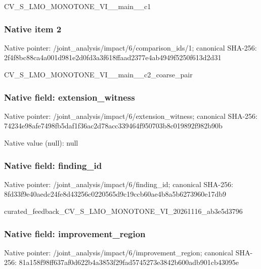 \documentclass[10pt,a4paper]{article}
\begin{document}
\begingroup\raggedright\sloppy CV\_\allowbreak{}S\_\allowbreak{}LMO\_\allowbreak{}MONOTONE\_\allowbreak{}VI\_\allowbreak{}\_\allowbreak{}main\_\allowbreak{}\_\allowbreak{}c1\par\endgroup

\subsubsection{Native item 2}
Native pointer: /joint\_\allowbreak{}analysis/impact/6/comparison\_\allowbreak{}ids/1; canonical SHA-256: 2f4f8bc88ca4a001d981e2d0fd3a3f618ffaad2377e4ab4949f5250f613d2d31

\begingroup\raggedright\sloppy CV\_\allowbreak{}S\_\allowbreak{}LMO\_\allowbreak{}MONOTONE\_\allowbreak{}VI\_\allowbreak{}\_\allowbreak{}main\_\allowbreak{}\_\allowbreak{}c2\_\allowbreak{}coarse\_\allowbreak{}pair\par\endgroup

\subsubsection{Native field: extension\_\allowbreak{}witness}
Native pointer: /joint\_\allowbreak{}analysis/impact/6/extension\_\allowbreak{}witness; canonical SHA-256: 74234e98afe7498fb5daf1f36ac2d78acc339464f950703b8c019892f982b90b

Native value (null): null

\subsubsection{Native field: finding\_\allowbreak{}id}
Native pointer: /joint\_\allowbreak{}analysis/impact/6/finding\_\allowbreak{}id; canonical SHA-256: 8fd33f9e40aedc24fe8d43256c0220565d9c19ccb60ae4b8a5b6273960e17db9

\begingroup\raggedright\sloppy curated\_\allowbreak{}feedback\_\allowbreak{}CV\_\allowbreak{}S\_\allowbreak{}LMO\_\allowbreak{}MONOTONE\_\allowbreak{}VI\_\allowbreak{}20261116\_\allowbreak{}ab3e5d3796\par\endgroup

\subsubsection{Native field: improvement\_\allowbreak{}region}
Native pointer: /joint\_\allowbreak{}analysis/impact/6/improvement\_\allowbreak{}region; canonical SHA-256: 81a158f98ff637af0d622b4a3853f29fad5745273e3842b600adb901cb43095e
\end{document}
